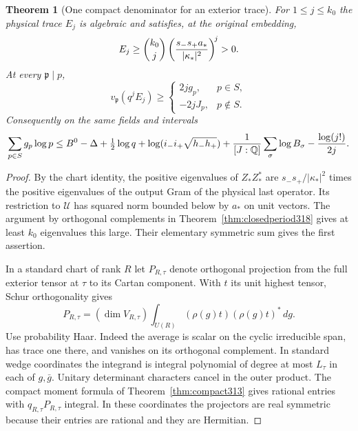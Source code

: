 \documentclass[a4paper,11pt]{article}
\newtheorem{theorem}[proposition]{Theorem}
\theoremstyle{definition}
\theoremstyle{remark}
\numberwithin{equation}{section}
\begin{document}
\begin{theorem}[One compact denominator for an exterior trace]\leavevmode
\label{thm:lasttrace320}
For \(1\le j\le k_0\) the physical trace \(E_j\) is
algebraic and satisfies, at the original embedding,
\[
 E_j\ge {k_0\choose j}
      \left({s_-s_+a_*\over|\kappa_*|^2}\right)^{\!j}>0 .
\]
At every \(\mathfrak p\mid p\),
\[
   v_{\mathfrak p}(q^j E_j)\ge
   \begin{cases}2j g_p,&p\in S,\\ -2jJ_p,&p\notin S.\end{cases}
\]
Consequently on the same fields and intervals
\[
 \sum_{p\in S}g_p\log p\le
 B^0-\Delta+\tfrac12\log q+
 \log(i_-i_+\sqrt{h_-h_+})+
 {1\over[J:\mathbb Q]}\sum_\sigma\log B_\sigma-
                         {\log(j!)\over 2j}.
\]
\end{theorem}
\begin{proof}
By the chart identity, the positive eigenvalues of
\(Z_*Z_*^*\) are \(s_-s_+/|\kappa_*|^2\) times the
positive eigenvalues of the output Gram of the physical
last operator. Its restriction to \(\mathcal U\) has
squared norm bounded below by \(a_*\) on unit vectors.
The argument by orthogonal complements in
Theorem~\ref{thm:closedperiod318} gives at least \(k_0\)
eigenvalues this large. Their elementary symmetric sum
gives the first assertion.

In a standard chart of rank \(R\) let \(P_{R,\tau}\) denote
orthogonal projection from the full exterior tensor at
\(\tau\) to its Cartan component. With \(t\) its unit
highest tensor, Schur orthogonality gives
\[
 P_{R,\tau}=(\dim V_{R,\tau})
          \int_{U(R)}(\rho(g)t)(\rho(g)t)^*\,dg .
\]
Use probability Haar. Indeed the average is scalar on the
cyclic irreducible span, has trace one there, and vanishes
on its orthogonal complement. In standard wedge coordinates
the integrand is integral polynomial of degree at most
\(L_\tau\) in each of \(g,\bar g\). Unitary determinant
characters cancel in the outer product. The compact moment
formula of Theorem~\ref{thm:compact313} gives rational
entries with \(q_{R,\tau}P_{R,\tau}\) integral. In these
coordinates the projectors are real symmetric because
their entries are rational and they are Hermitian.


\end{proof}
\end{document}
